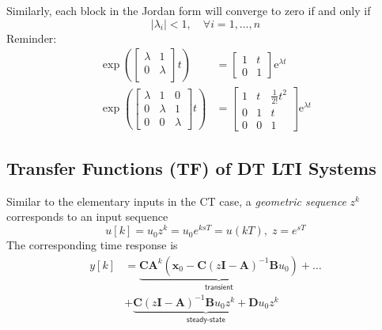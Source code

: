 
Similarly, each block in the Jordan form will converge to zero if and only if
\begin{equation*}
    |\lambda_i| <1,\quad\forall i=1,\ldots,n
\end{equation*}
Reminder:
\begin{align*}
    \left.\exp\left(
    \begin{bmatrix}\lambda & 1       \\
               0       & \lambda \\
        \end{bmatrix}\right.t\right)           & =
    \begin{bmatrix}1 & t \\
               0 & 1
    \end{bmatrix}
    \text{e}^{\lambda t}                       \\
    \left.\exp\left(
    \begin{bmatrix}\lambda & 1       & 0       \\
               0       & \lambda & 1       \\
               0       & 0       & \lambda
        \end{bmatrix}\right.t\right) & =
    \begin{bmatrix}1 & t & \frac{1}{2!}t^2 \\
               0 & 1 & t               \\
               0 & 0 & 1
    \end{bmatrix}
    \text{e}^{\lambda t}
\end{align*}

\subsection{Transfer Functions (TF) of DT LTI Systems}\label{disc:tf}

Similar to the elementary inputs in the CT case, a \textit{geometric sequence} $z^k$ corresponds to an input sequence
\begin{equation*}
    u[k] =u_0z^k=u_0e^{ksT}=u(kT), \; z=e^{sT}
\end{equation*}
The corresponding time response is
\begin{align*}
    y[k] & = \underbrace{\mathbf{CA}^k(\mathbf{x}_0-\mathbf{C}{(z\mathbf{I}-\mathbf{A})}^{-1}\mathbf{B}u_0)}_{\textsf{transient}}+\dots \\
         & +\underbrace{\mathbf{C}{(z\mathbf{I}-\mathbf{A})}^{-1}\mathbf{B}u_0z^k+\mathbf{D}u_0z^k}_{\textsf{steady-state}}
\end{align*}

